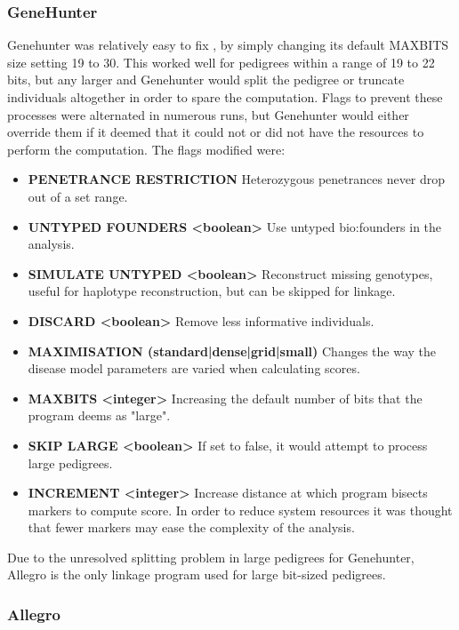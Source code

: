 \subsubsection{GeneHunter}

Genehunter was relatively easy to fix , by simply changing its default MAXBITS size setting 19 to 30. This worked well for pedigrees within a range of 19 to 22 bits, but any larger and Genehunter would split the pedigree or truncate individuals altogether in order to spare the computation. Flags to prevent these processes were alternated in numerous runs, but Genehunter would either override them if it deemed that it could not or did not have the resources to perform the computation. The flags modified were:

\begin{itemize}
\item{{\bf\footnotesize PENETRANCE RESTRICTION} Heterozygous penetrances never drop out of a set range.}
\item{{\bf\footnotesize UNTYPED FOUNDERS <boolean>} Use untyped \gls{bio:founders} in the analysis.}
\item{{\bf\footnotesize SIMULATE UNTYPED <boolean>} Reconstruct missing genotypes, useful for haplotype reconstruction, but can be skipped for linkage.}
\item{{\bf\footnotesize DISCARD <boolean>} Remove less informative individuals.}
\item{{\bf\footnotesize MAXIMISATION (standard|dense|grid|small)} Changes the way the disease model parameters are varied when calculating scores.}
\item{{\bf\footnotesize MAXBITS <integer>} Increasing the default number of bits that the program deems as "large".}
\item{{\bf\footnotesize SKIP LARGE <boolean>} If set to false, it would attempt to process large pedigrees.}
\item{{\bf\footnotesize INCREMENT <integer>} Increase distance at which program bisects markers to compute score. In order to reduce system resources it was thought that fewer markers may ease the complexity of the analysis.}
\end{itemize}

Due to the unresolved splitting problem in large pedigrees for Genehunter, Allegro is the only linkage program used for large bit-sized pedigrees.


\subsubsection{Allegro}\label{ref:meth:allegrobigdata}

